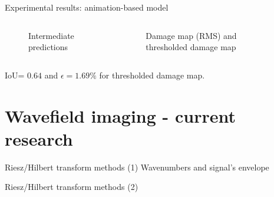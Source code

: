\documentclass[10pt,aspectratio=169,dvipsnames]{beamer} %
\begin{document}
\setcounter{subfigure}{0}
\begin{frame}{Experimental results: animation-based model}
		\centering
		\begin{columns}[T]		
			\begin{column}{0.32\textwidth}
				\begin{figure}
					\caption{Intermediate predictions}
				\end{figure}	
			\end{column}
		\begin{column}{0.65\textwidth}
			\begin{figure}
				\caption{Damage map (RMS) and thresholded damage map}	
			\end{figure}
		
		\end{column}
	\end{columns}
	
IoU= $0.64$ and $\epsilon=1.69\%$ for thresholded damage map.
\end{frame}
\section{Wavefield imaging - current research}
\begin{frame}{Riesz/Hilbert transform methods (1)}
\centering
Wavenumbers and signal's envelope
	\begin{figure}
	\end{figure}	
\end{frame}
\begin{frame}{Riesz/Hilbert transform methods (2)}
	\centering
	\setcounter{subfigure}{0}
	\begin{figure}
		\quad
	\end{figure}	
\end{frame}
\end{document}
